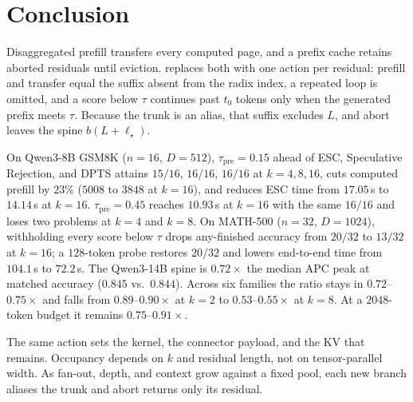 \section{Conclusion}
\label{sec:conclusion}

Disaggregated prefill transfers every computed page, and a prefix cache retains aborted residuals until eviction.
\sys replaces both with one action per residual: prefill and transfer equal the suffix absent from the radix index, a repeated loop is omitted, and a score below $\tau$ continues past $t_0$ tokens only when the generated prefix meets $\tau$.
Because the trunk is an alias, that suffix excludes $L$, and abort leaves the spine $b(L+\ell_\star)$.

On Qwen3-8B GSM8K ($n{=}16$, $D{=}512$), $\tau_{\mathrm{pre}}{=}0.15$ ahead of ESC, Speculative Rejection, and DPTS attains $15/16$, $16/16$, $16/16$ at $k{=}4,8,16$, cuts computed prefill by $23\%$ ($5008$ to $3848$ at $k{=}16$), and reduces ESC time from $17.05$\,s to $14.14$\,s at $k{=}16$.
$\tau_{\mathrm{pre}}{=}0.45$ reaches $10.93$\,s at $k{=}16$ with the same $16/16$ and loses two problems at $k{=}4$ and $k{=}8$.
On MATH-500 ($n{=}32$, $D{=}1024$), withholding every score below $\tau$ drops any-finished accuracy from $20/32$ to $13/32$ at $k{=}16$; a $128$-token probe restores $20/32$ and lowers end-to-end time from $104.1$\,s to $72.2$\,s.
The Qwen3-14B spine is $0.72\times$ the median APC peak at matched accuracy ($0.845$ vs.\ $0.844$).
Across six families the ratio stays in $0.72$--$0.75\times$ and falls from $0.89$--$0.90\times$ at $k{=}2$ to $0.53$--$0.55\times$ at $k{=}8$.
At a $2048$-token budget it remains $0.75$--$0.91\times$.

The same action sets the kernel, the connector payload, and the KV that remains.
Occupancy depends on $k$ and residual length, not on tensor-parallel width.
As fan-out, depth, and context grow against a fixed pool, each new branch aliases the trunk and abort returns only its residual.
